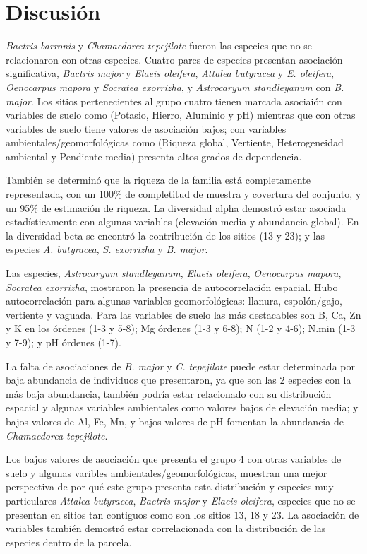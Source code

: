 \documentclass[11pt,]{article}
\begin{document}
\section{Discusión}\label{discusiuxf3n}

\emph{Bactris barronis} y \emph{Chamaedorea tepejilote} fueron las
especies que no se relacionaron con otras especies. Cuatro pares de
especies presentan asociación significativa, \emph{Bactris major} y
\emph{Elaeis oleifera}, \emph{Attalea butyracea} y \emph{E. oleifera},
\emph{Oenocarpus mapora} y \emph{Socratea exorrizha}, y
\emph{Astrocaryum standleyanum} con \emph{B. major}. Los sitios
pertenecientes al grupo cuatro tienen marcada asociaión con variables de
suelo como (Potasio, Hierro, Aluminio y pH) mientras que con otras
variables de suelo tiene valores de asociación bajos; con variables
ambientales/geomorfológicas como (Riqueza global, Vertiente,
Heterogeneidad ambiental y Pendiente media) presenta altos grados de
dependencia.

También se determinó que la riqueza de la familia está completamente
representada, con un 100\% de completitud de muestra y covertura del
conjunto, y un 95\% de estimación de riqueza. La diversidad alpha
demostró estar asociada estadísticamente con algunas variables
(elevación media y abundancia global). En la diversidad beta se encontró
la contribución de los sitios (13 y 23); y las especies \emph{A.
butyracea}, \emph{S. exorrizha} y \emph{B. major}.

Las especies, \emph{Astrocaryum standleyanum}, \emph{Elaeis oleifera},
\emph{Oenocarpus mapora}, \emph{Socratea exorrizha}, mostraron la
presencia de autocorrelación espacial. Hubo autocorrelación para algunas
variables geomorfológicas: llanura, espolón/gajo, vertiente y vaguada.
Para las variables de suelo las más destacables son B, Ca, Zn y K en los
órdenes (1-3 y 5-8); Mg órdenes (1-3 y 6-8); N (1-2 y 4-6); N.min (1-3 y
7-9); y pH órdenes (1-7).

La falta de asociaciones de \emph{B. major} y \emph{C. tepejilote} puede
estar determinada por baja abundancia de individuos que presentaron, ya
que son las 2 especies con la más baja abundancia, también podría estar
relacionado con su distribución espacial y algunas variables ambientales
como valores bajos de elevación media; y bajos valores de Al, Fe, Mn, y
bajos valores de pH fomentan la abundancia de \emph{Chamaedorea
tepejilote}.

Los bajos valores de asociación que presenta el grupo 4 con otras
variables de suelo y algunas varibles ambientales/geomorfológicas,
muestran una mejor perspectiva de por qué este grupo presenta esta
distribución y especies muy particulares \emph{Attalea butyracea},
\emph{Bactris major} y \emph{Elaeis oleifera}, especies que no se
presentan en sitios tan contiguos como son los sitios 13, 18 y 23. La
asociación de variables también demostró estar correlacionada con la
distribución de las especies dentro de la parcela.
\end{document}
